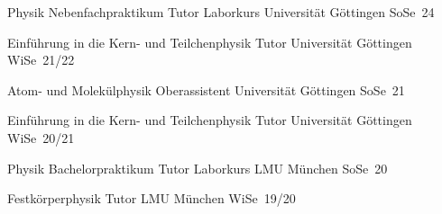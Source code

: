 \begin{cvhonorsleft}[4.5cm]
  \cvhonor
    {Physik Nebenfachpraktikum} %
    {Tutor Laborkurs} %
    {Universit\"at G\"ottingen} %
    {SoSe~24} %

  \cvhonor
    {Einf\"uhrung in die Kern- und Teilchenphysik} %
    {Tutor} %
    {Universit\"at G\"ottingen} %
    {WiSe~21/22} %

  \cvhonor
    {Atom- und Molek\"ulphysik} %
    {%
      Oberassistent%
    } %
    {Universit\"at G\"ottingen} %
    {SoSe~21} %

  \cvhonor
    {Einf\"uhrung in die Kern- und Teilchenphysik} %
    {Tutor} %
    {Universit\"at G\"ottingen} %
    {WiSe~20/21} %

  \cvhonor
    {Physik Bachelorpraktikum} %
    {Tutor Laborkurs} %
    {LMU M\"unchen} %
    {SoSe~20} %

  \cvhonor
    {Festk\"orperphysik} %
    {Tutor} %
    {LMU M\"unchen} %
    {WiSe~19/20} %
\end{cvhonorsleft}
